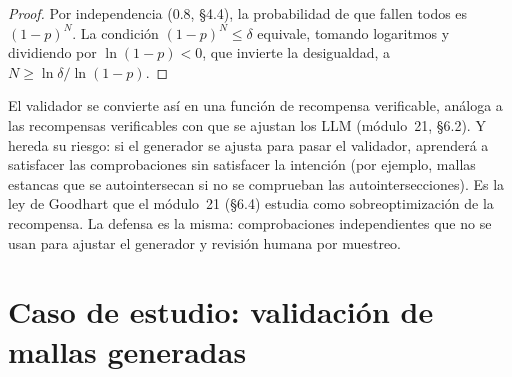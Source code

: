 \begin{proof}
Por independencia (0.8, §4.4), la probabilidad de que fallen todos es $(1-p)^N$. La condición $(1-p)^N\le\delta$ equivale, tomando logaritmos y dividiendo por $\ln(1-p)<0$, que invierte la desigualdad, a $N\ge\ln\delta/\ln(1-p)$.
\end{proof}

El validador se convierte así en una función de recompensa verificable, análoga a las recompensas verificables con que se ajustan los LLM (módulo~21, §6.2). Y hereda su riesgo: si el generador se ajusta para pasar el validador, aprenderá a satisfacer las comprobaciones sin satisfacer la intención (por ejemplo, mallas estancas que se autointersecan si no se comprueban las autointersecciones). Es la ley de Goodhart que el módulo~21 (§6.4) estudia como sobreoptimización de la recompensa. La defensa es la misma: comprobaciones independientes que no se usan para ajustar el generador y revisión humana por muestreo.

\section{Caso de estudio: validación de mallas generadas}

